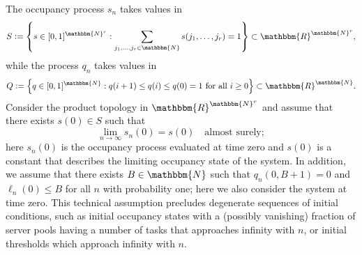 \documentclass[a4paper, 12pt]{article}
\theoremstyle{definition}
\newcommand{\set}[2]{\left\{#1 : #2\right\}}
\newcommand{\defeq}{\vcentcolon=}
\newcommand{\N}{\mathbbm{N}}
\newcommand{\R}{\mathbbm{R}}
\begin{document}
The occupancy process $s_n$ takes values in
\begin{equation*}
	S \defeq \set{s \in [0, 1]^{\N^r}}{\sum_{j_1, \dots, j_r \in \N} s(j_1, \dots, j_r) = 1} \subset \R^{\N^r},
\end{equation*}
while the process $q_n$ takes values in
\begin{equation*}
	Q \defeq \set{q \in [0, 1]^{\N}}{q(i + 1) \leq q(i) \leq q(0) = 1\ \text{for all}\ i \geq 0} \subset \R^\N.
\end{equation*}
Consider the product topology in $\R^{\N^r}$ and assume that there exists $s(0) \in S$ such that
\begin{equation}
	\label{ass: convergence of initial conditions}
	\lim_{n \to \infty} s_n(0) = s(0) \quad \text{almost surely};
\end{equation}
here $s_n(0)$ is the occupancy process evaluated at time zero and $s(0)$ is a constant that describes the limiting occupancy state of the system. In addition, we assume that there exists $B \in \N$ such that $q_n(0, B + 1) = 0$ and $\ell_n(0) \leq B$ for all $n$ with probability one; here we also consider the system at time zero. This technical assumption precludes degenerate sequences of initial conditions, such as initial occupancy states with a (possibly vanishing) fraction of server pools having a number of tasks that approaches infinity with $n$, or initial thresholds which approach infinity with $n$.
\end{document}
